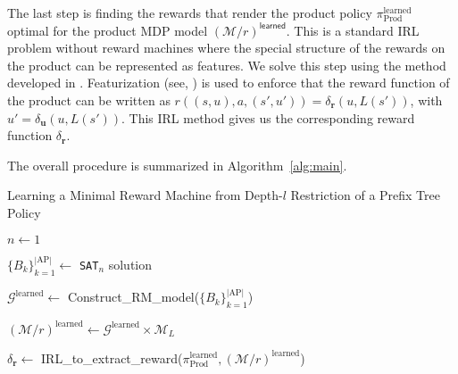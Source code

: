 \documentclass[letterpaper, 10 pt, conference]{ieeeconf}
\begin{document}
The last step is finding the rewards that render the product policy $\pi_{\mathrm{Prod}}^{\mathrm{learned}}$ optimal for the product MDP model $(\mathcal{M}/r)^{\mathsf{learned}}$. This is a standard IRL problem without reward machines where the special structure of the rewards on the product can be represented as features. We solve this step using the method developed in \cite{shehab2024learning}. Featurization (see, \cite[Section~4]{shehab2024learning}) is used to enforce that the reward function of the product can be written as $r((s,u),a,(s',u'))=\delta_\mathbf{r}(u,L(s'))$, with $u'=\delta_\mathbf{u}(u,L(s'))$. This IRL method gives us the corresponding reward function $\delta_\mathbf{r}$. 

The overall procedure is summarized in Algorithm~\ref{alg:main}.


\begin{algorithm}
\caption{Learning a Minimal Reward Machine from Depth-$l$ Restriction of a Prefix Tree Policy}\label{alg:main}

$n \gets 1$\;

$\{B_k\}_{k=1}^{|\mathrm{AP}|} \gets$ \texttt{SAT}$_n$ solution \;

$\mathcal{G}^{\mathrm{learned}} \gets$ Construct\_RM\_model($\{B_k\}_{k=1}^{|\mathrm{AP}|}$)\;

$(\mathcal{M}/r)^{\mathrm{learned}} \gets \mathcal{G}^{\mathrm{learned}} \times \mathcal{M}_L$\;


$\delta_\mathbf{r} \gets$ IRL\_to\_extract\_reward($\pi_{\mathrm{Prod}}^{\mathrm{learned}},(\mathcal{M}/r)^{\mathrm{learned}}$)

\;
\end{algorithm}
\end{document}
